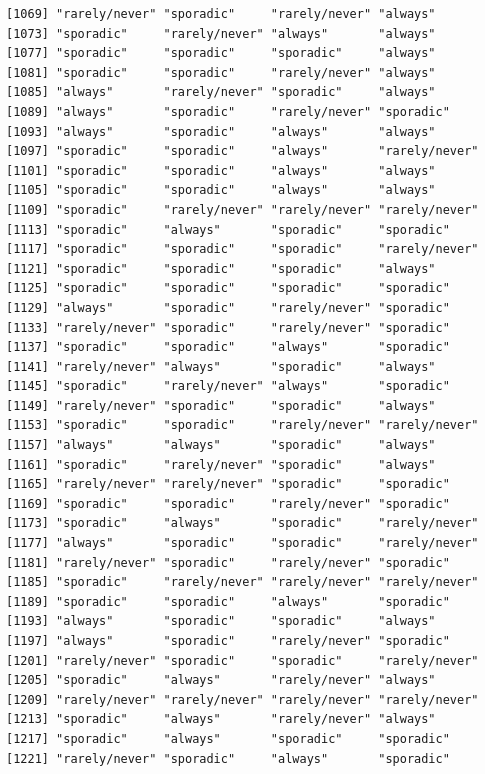 \documentclass[
  letterpaper,
  DIV=11,
  numbers=noendperiod]{scrartcl}
\begin{document}
\begin{verbatim}
[1069] "rarely/never" "sporadic"     "rarely/never" "always"      
[1073] "sporadic"     "rarely/never" "always"       "always"      
[1077] "sporadic"     "sporadic"     "sporadic"     "always"      
[1081] "sporadic"     "sporadic"     "rarely/never" "always"      
[1085] "always"       "rarely/never" "sporadic"     "always"      
[1089] "always"       "sporadic"     "rarely/never" "sporadic"    
[1093] "always"       "sporadic"     "always"       "always"      
[1097] "sporadic"     "sporadic"     "always"       "rarely/never"
[1101] "sporadic"     "sporadic"     "always"       "always"      
[1105] "sporadic"     "sporadic"     "always"       "always"      
[1109] "sporadic"     "rarely/never" "rarely/never" "rarely/never"
[1113] "sporadic"     "always"       "sporadic"     "sporadic"    
[1117] "sporadic"     "sporadic"     "sporadic"     "rarely/never"
[1121] "sporadic"     "sporadic"     "sporadic"     "always"      
[1125] "sporadic"     "sporadic"     "sporadic"     "sporadic"    
[1129] "always"       "sporadic"     "rarely/never" "sporadic"    
[1133] "rarely/never" "sporadic"     "rarely/never" "sporadic"    
[1137] "sporadic"     "sporadic"     "always"       "sporadic"    
[1141] "rarely/never" "always"       "sporadic"     "always"      
[1145] "sporadic"     "rarely/never" "always"       "sporadic"    
[1149] "rarely/never" "sporadic"     "sporadic"     "always"      
[1153] "sporadic"     "sporadic"     "rarely/never" "rarely/never"
[1157] "always"       "always"       "sporadic"     "always"      
[1161] "sporadic"     "rarely/never" "sporadic"     "always"      
[1165] "rarely/never" "rarely/never" "sporadic"     "sporadic"    
[1169] "sporadic"     "sporadic"     "rarely/never" "sporadic"    
[1173] "sporadic"     "always"       "sporadic"     "rarely/never"
[1177] "always"       "sporadic"     "sporadic"     "rarely/never"
[1181] "rarely/never" "sporadic"     "rarely/never" "sporadic"    
[1185] "sporadic"     "rarely/never" "rarely/never" "rarely/never"
[1189] "sporadic"     "sporadic"     "always"       "sporadic"    
[1193] "always"       "sporadic"     "sporadic"     "always"      
[1197] "always"       "sporadic"     "rarely/never" "sporadic"    
[1201] "rarely/never" "sporadic"     "sporadic"     "rarely/never"
[1205] "sporadic"     "always"       "rarely/never" "always"      
[1209] "rarely/never" "rarely/never" "rarely/never" "rarely/never"
[1213] "sporadic"     "always"       "rarely/never" "always"      
[1217] "sporadic"     "always"       "sporadic"     "sporadic"    
[1221] "rarely/never" "sporadic"     "always"       "sporadic"    

\end{verbatim}
\end{document}
